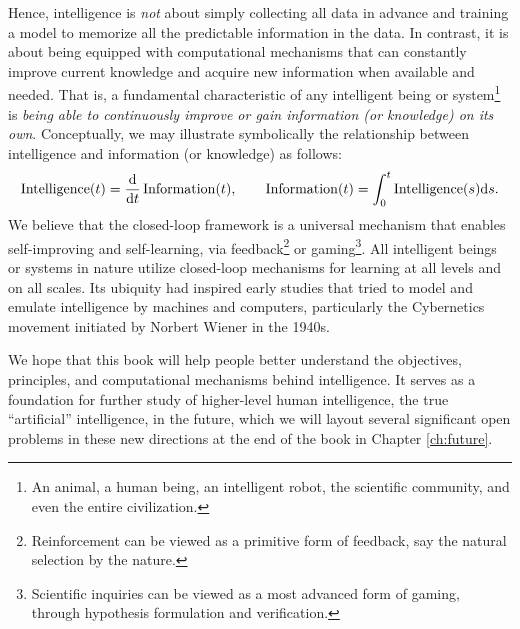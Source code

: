 \documentclass[../../book-main.tex]{subfiles}
\begin{document}
Hence, intelligence is {\em not} about simply collecting all data in advance and training a model to memorize all the predictable information in the data. In contrast, it is about being equipped with computational mechanisms that can constantly improve current knowledge and acquire new information when available and needed. That is, a fundamental characteristic of any intelligent being or system\footnote{An animal, a human being, an intelligent robot, the scientific community, and even the entire civilization.} is {\em being able to continuously improve or gain information (or knowledge) on its own}. Conceptually, we may illustrate symbolically the relationship between intelligence and information (or knowledge) as follows:
\begin{equation}
\operatorname{Intelligence}(t) = \odv*{\operatorname{Information}}{t}(t), \qquad 
\operatorname{Information}(t)  = \int_0^t \operatorname{Intelligence}(s) \odif{s}.
\end{equation}
We believe that the closed-loop framework is a universal mechanism that enables self-improving and self-learning, via feedback\footnote{Reinforcement can be viewed as a primitive form of feedback, say the natural selection by the nature.} or gaming\footnote{Scientific inquiries can be viewed as a most advanced form of gaming, through hypothesis formulation and verification.}. All intelligent beings or systems in nature utilize closed-loop mechanisms for learning at all levels and on all scales. Its ubiquity had inspired early studies that tried to model and emulate intelligence by machines and computers, particularly the Cybernetics movement initiated by Norbert Wiener in the 1940s. 

We hope that this book will help people better understand the objectives, principles, and computational mechanisms behind intelligence. It serves as a foundation for further study of higher-level human intelligence, the true ``artificial'' intelligence, in the future, which we will layout several significant open problems in these new directions at the end of the book in Chapter \ref{ch:future}.
\end{document}
